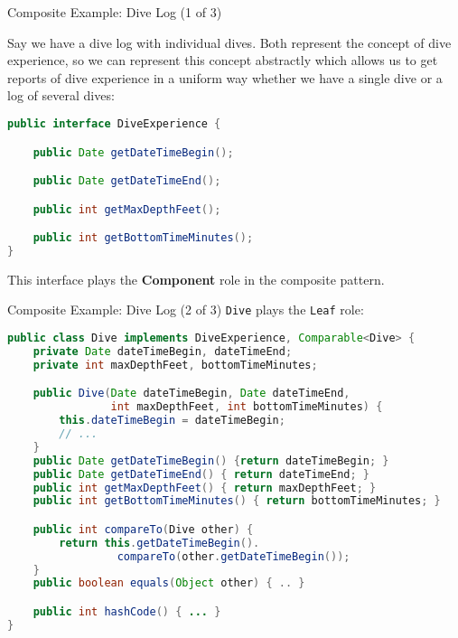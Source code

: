 \documentclass{beamer}
\begin{document}
\begin{frame}[fragile]{Composite Example: Dive Log (1 of 3)}


Say we have a dive log with individual dives.  Both represent the concept of dive experience, so we can represent this concept abstractly which allows us to get reports of dive experience in a uniform way whether we have a single dive or a log of several dives:
\begin{lstlisting}[language=Java]
public interface DiveExperience {

    public Date getDateTimeBegin();

    public Date getDateTimeEnd();

    public int getMaxDepthFeet();

    public int getBottomTimeMinutes();
}
\end{lstlisting}

This interface plays the {\bf Component} role in the composite pattern.

\end{frame}

\begin{frame}[fragile]{Composite Example: Dive Log (2 of 3)}
\vspace{-.05in}
{\tt Dive} plays the {\tt Leaf} role:
\vspace{-.05in}
\begin{lstlisting}[language=Java]
public class Dive implements DiveExperience, Comparable<Dive> {
    private Date dateTimeBegin, dateTimeEnd;
    private int maxDepthFeet, bottomTimeMinutes;

    public Dive(Date dateTimeBegin, Date dateTimeEnd, 
                int maxDepthFeet, int bottomTimeMinutes) {
        this.dateTimeBegin = dateTimeBegin;
        // ...
    }
    public Date getDateTimeBegin() {return dateTimeBegin; }
    public Date getDateTimeEnd() { return dateTimeEnd; }
    public int getMaxDepthFeet() { return maxDepthFeet; }
    public int getBottomTimeMinutes() { return bottomTimeMinutes; }

    public int compareTo(Dive other) {
        return this.getDateTimeBegin().
                 compareTo(other.getDateTimeBegin());
    }
    public boolean equals(Object other) { .. }

    public int hashCode() { ... }
}
\end{lstlisting}

\end{frame}
\end{document}

